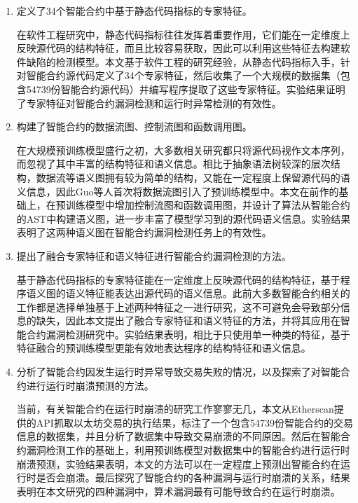 \begin{enumerate}[label=(\arabic*)]
    \item 定义了34个智能合约中基于静态代码指标的专家特征。
    
    在软件工程研究中，静态代码指标往往发挥着重要作用，它们能在一定维度上反映源代码的结构特征，而且比较容易获取，因此可以利用这些特征去构建软件缺陷的检测模型。本文基于软件工程的研究经验，从静态代码指标入手，针对智能合约源代码定义了34个专家特征，然后收集了一个大规模的数据集（包含\num{54739}份智能合约源代码）并编写程序提取了这些专家特征。实验结果证明了专家特征对智能合约漏洞检测和运行时异常检测的有效性。
    
    \item 构建了智能合约的数据流图、控制流图和函数调用图。
    
    在大规模预训练模型盛行之初，大多数相关研究都只将源代码视作文本序列，而忽视了其中丰富的结构特征和语义信息。相比于抽象语法树较深的层次结构，数据流等语义图拥有较为简单的结构，又能在一定程度上保留源代码的语义信息，因此Guo等人\cite{guo2020graphcodebert}首次将数据流图引入了预训练模型中。本文在前作的基础上，在预训练模型中增加控制流图和函数调用图，并设计了算法从智能合约的AST中构建语义图，进一步丰富了模型学习到的源代码语义信息。实验结果表明了这两种语义图在智能合约漏洞检测任务上的有效性。

    \item 提出了融合专家特征和语义特征进行智能合约漏洞检测的方法。
    
    基于静态代码指标的专家特征能在一定维度上反映源代码的结构特征，基于程序语义图的语义特征能表达出源代码的语义信息。此前大多数智能合约相关的工作都是选择单独基于上述两种特征之一进行研究，这不可避免会导致部分信息的缺失，因此本文提出了融合专家特征和语义特征的方法，并将其应用在智能合约漏洞检测研究中。实验结果表明，相比于只使用单一种类的特征，基于特征融合的预训练模型更能有效地表达程序的结构特征和语义信息。

    \item 分析了智能合约因发生运行时异常导致交易失败的情况，以及探索了对智能合约进行运行时崩溃预测的方法。

    当前，有关智能合约在运行时崩溃的研究工作寥寥无几，本文从Etherscan提供的API抓取以太坊交易的执行结果，标注了一个包含\num{54739}份智能合约的交易信息的数据集，并且分析了数据集中导致交易崩溃的不同原因。然后在智能合约漏洞检测工作的基础上，利用预训练模型对数据集中的智能合约进行运行时崩溃预测，实验结果表明，本文的方法可以在一定程度上预测出智能合约在运行时是否会崩溃。最后探究了智能合约的各种漏洞与运行时崩溃的关系，结果表明在本文研究的四种漏洞中，算术漏洞最有可能导致合约在运行时崩溃。

\end{enumerate}
